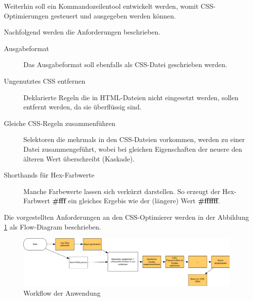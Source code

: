 Weiterhin soll ein Kommandozeilentool entwickelt werden, womit CSS-Optimierungen gesteuert und ausgegeben werden können. 

Nachfolgend werden die Anforderungen beschrieben.

\begin{description}
    \item[Ausgabeformat] Das Ausgabeformat soll ebenfalls als CSS-Datei geschrieben werden.
    
    \item[Ungenutztes CSS entfernen] Deklarierte Regeln die in HTML-Dateien nicht eingesetzt werden, sollen entfernt werden, da sie überflüssig sind.
    
    \item[Gleiche CSS-Regeln zusammenführen] Selektoren die mehrmals in den CSS-Dateien vorkommen, werden zu einer Datei zusammengeführt, wobei bei gleichen Eigenschaften der neuere den älteren Wert überschreibt (Kaskade).
    
    \item[Shorthands für Hex-Farbwerte] Manche Farbewerte lassen sich verkürzt darstellen. So erzeugt der Hex-Farbwert \textbf{\#fff} ein gleiches Ergebis wie der (längere) Wert \textbf{\#ffffff}. 
    
    \item[]
\end{description}

Die vorgestellten Anforderungen an den CSS-Optimierer werden in der Abbildung \ref{app-workflow} als Flow-Diagram beschrieben. 

\begin{figure}[h!]
	\begin{center}
		\includegraphics[width=1.0\textwidth]{img/app-workflow.png}
		\caption{Workflow der Anwendung}
		\label{app-workflow}	
	\end{center}
\end{figure}
